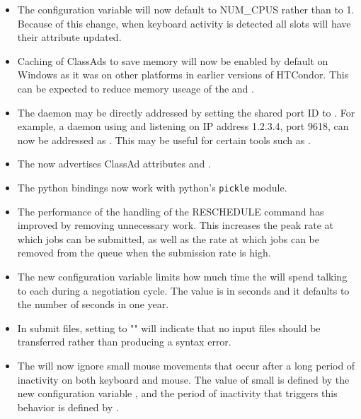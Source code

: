 \begin{itemize}

\item The configuration variable  will now
default to NUM_CPUS rather than to 1.  Because of this change, when keyboard
activity is detected all slots will have their 
attribute updated.

\item Caching of ClassAds to save memory will now be enabled by default on
Windows as it was on other platforms in earlier versions of HTCondor.  This
can be expected to reduce memory useage of the  and .

\item The  daemon may be directly addressed by setting
the shared port ID to .
For example, a daemon using  and listening
on IP address 1.2.3.4, port 9618,
can now be addressed as .
This may be useful for certain tools such as .

\item The  now advertises ClassAd attributes
 and .

\item The python bindings now work with python's \texttt{pickle} module.

\item The performance of the  handling of the RESCHEDULE
command has improved by removing unnecessary work.
This increases the peak rate at which jobs can be submitted,
as well as the rate at which jobs can be removed from the queue
when the submission rate is high.

\item The new configuration variable
 limits how much time the
 will spend talking to each  during a
negotiation cycle.
The value is in seconds and it defaults to the number of seconds in one year.

\item In submit files, setting  to "" will indicate
that no input files should be transferred rather than producing a syntax error.

\item The  will now ignore small mouse movements that occur after a long
period of inactivity on both keyboard and mouse.  The value of small is defined by the new
configuration variable , and the period of inactivity
that triggers this behavior is defined by .


\end{itemize}
